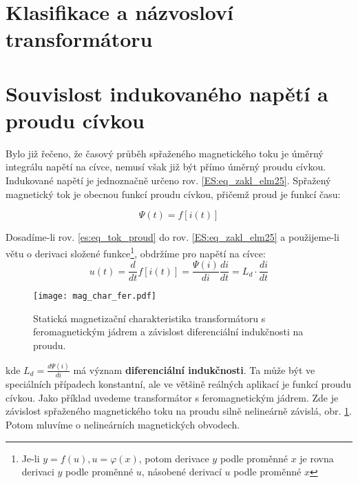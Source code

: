 {  %
  \section{Klasifikace a názvosloví transformátoru}

  \section{Souvislost indukovaného napětí a proudu cívkou}
    Bylo již řečeno, že časový průběh spřaženého magnetického toku je úměrný integrálu napětí na 
    cívce, nemusí však již být přímo úměrný proudu cívkou. Indukované napětí je jednoznačně určeno 
    rov. \ref{ES:eq_zakl_elm25}. Spřažený magnetický tok je obecnou funkcí proudu cívkou, přičemž 
    proud je
    funkcí času:
    
    \begin{equation}\label{es:eq_tok_proud}
      \Psi(t) = f[i(t)]
    \end{equation}           

    Dosadíme-li rov. \ref{es:eq_tok_proud} do rov. \ref{ES:eq_zakl_elm25} a použijeme-li větu o 
    derivaci složené funkce\footnote{Je-li $y = f(u), u = \varphi(x)$, potom derivace $y$ podle 
    proměnné $x$ je rovna derivaci $y$ podle proměnné $u$, násobené derivací $u$ podle proměnné 
    $x$}, obdržíme pro napětí na cívce:
    \begin{equation}\label{es_tok_deriv}
      u(t) = \frac{d}{dt} f[i(t)] = \frac{\Psi(i)}{di} \frac{di}{dt} = L_d \cdot \frac{di}{dt}
    \end{equation}

    \begin{figure}[ht!]  %
      \centering
      \texttt{[image: mag\_char\_fer.pdf]}
      \caption{Statická magnetizační charakteristika transformátoru s feromagnetickým jádrem a 
        závislost diferenciální indukčnosti na proudu. \cite[s.~5]{Elrev2005trafo}}
      \label{es:fig_mag_char_trafa_fer}
    \end{figure}
    
    kde $L_d=\frac{d\Psi(i)}{di}$ má význam \textbf{diferenciální indukčnosti}. Ta může být ve 
    speciálních případech konstantní, ale ve většině reálných aplikací je funkcí proudu cívkou. 
    Jako příklad uvedeme transformátor s feromagnetickým jádrem. Zde je závislost spřaženého 
    magnetického toku na proudu silně nelineárně závislá, obr. \ref{es:fig_mag_char_trafa_fer}. 
    Potom mluvíme o nelineárních magnetických obvodech.

}
